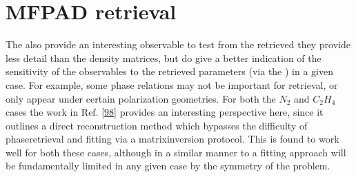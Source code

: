\documentclass[letterpaper,table,10pt,english]{jupyterBook}
\begin{document}
\section{MF\sphinxhyphen{}PAD retrieval}
\label{\detokenize{part2/case-study-summaries_240723:mf-pad-retrieval}}
\sphinxAtStartPar
The {\hyperref[\detokenize{backmatter/glossary:term-MF}]{}} also provide an interesting observable to test from the retrieved {\hyperref[\detokenize{backmatter/glossary:term-radial-matrix-elements}]{}} \sphinxhyphen{} they provide less detail than the density matrices, but do give a better indication of the sensitivity of the observables to the retrieved parameters (via the {\hyperref[\detokenize{backmatter/glossary:term-channel-functions}]{}}) in a given case. For example, some phase relations may not be important for {\hyperref[\detokenize{backmatter/glossary:term-MF}]{}} retrieval, or only appear under certain polarization geometries. For both the \(N_2\) and \(C_2H_4\) cases the work in Ref. {[}\hyperlink{cite.backmatter/bibliography:id635}{98}{]} provides an interesting perspective here, since it outlines a direct {\hyperref[\detokenize{backmatter/glossary:term-MF}]{}} reconstruction method which bypasses the difficulty of phase\sphinxhyphen{}retrieval and fitting via a matrix\sphinxhyphen{}inversion protocol. This is found to work well for both these cases, although in a similar manner to a fitting approach will be fundamentally limited in any given case by the symmetry of the problem.
\end{document}
